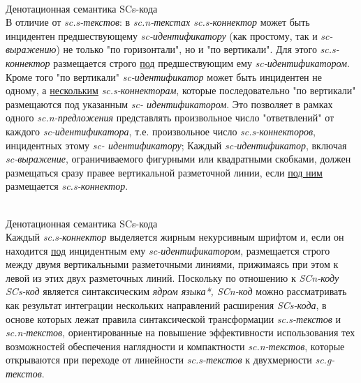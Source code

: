 \begin{frame}{\\Денотационная семантика SCs-кода}
	\topline
	\justifying
	\vspace*{\fill}\\
	В отличие от \textit{sc.s-текстов}: в \textit{sc.n-текстах sc.s-коннектор} может быть инцидентен предшествующему \textit{sc-идентификатору} (как простому, так и \textit{sc-выражению}) не только "по горизонтали", но и "по вертикали". Для этого \textit{sc.s-коннектор} размещается строго \underline{под} предшествующим ему \textit{sc-идентификатором}.\\ Кроме того "по вертикали" \textit{sc-идентификатор} может быть инцидентен не одному, а \underline{нескольким} \textit{sc.s-коннекторам}, которые последовательно "по вертикали" размещаются под указанным \textit{sc- идентификатором}. Это позволяет в рамках одного \textit{sc.n-предложения} представлять произвольное число "ответвлений" от каждого \textit{sc-идентификатора}, т.е. произвольное число \textit{sc.s-коннекторов}, инцидентных этому \textit{sc- идентификатору}; Каждый \textit{sc-идентификатор}, включая \textit{sc-выражение}, ограничиваемого фигурными или квадратными скобками, должен размещаться сразу правее вертикальной разметочной линии, если \underline{под ним} размещается \textit{sc.s-коннектор}.
\end{frame}

\begin{frame}{\\Денотационная семантика SCs-кода}
	\topline
	\justifying
	\vspace*{\fill}\\
	Каждый \textit{sc.s-коннектор} выделяется жирным некурсивным шрифтом и, если он находится \underline{под} инцидентным ему \textit{sc-идентификатором}, размещается строго между двумя вертикальными разметочными линиями, прижимаясь при этом к левой из этих двух разметочных линий.
	Поскольку по отношению к \textit{SCn-коду SCs-код} является синтаксическим \textit{ядром языка*, SCn-код} можно рассматривать как результат интеграции нескольких направлений расширения \textit{SCs-кода}, в основе которых лежат правила синтаксической трансформации \textit{sc.s-текстов} и \textit{sc.n-текстов}, ориентированные на повышение эффективности использования тех возможностей обеспечения наглядности и компактности \textit{sc.n-текстов}, которые открываются при переходе от линейности \textit{sc.s-текстов} к двухмерности \textit{sc.g-текстов}.
\end{frame}
